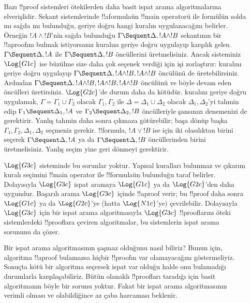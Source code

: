 Bazı !!{proof} sistemleri ötekilerden daha basit ispat arama algoritmalarına
elverişlidir. Sekant sistemlerinde !!a{formula}{}ün !!{main operator}{}ü ile
formülün solda mı sağda mı bulunduğu, geriye doğru hangi kuralın uygulanacağını
belirler. Örneğin $!A \land !B$'nin sağda bulunduğu
$\Gamma \Sequent \Delta, !A \land !B$ sekantının bir !!a{proof}{}ını bulmak
istiyorsanız \RightR{\land} kuralını geriye doğru uygulayıp karşılık gelen
$\Gamma \Sequent \Delta, !A$ ile $\Gamma \Sequent \Delta, !B$ öncüllerini
üretmelisiniz. Ancak sisteminiz $\Log{G1c}$ ise büzülme size daha çok seçenek
verdiği için işi zorlaştırır: \RightR{\Contraction} kuralını geriye doğru
uygulayıp $\Gamma \Sequent \Delta, !A \land !B, !A \land !B$ öncülünü de
üretebilirsiniz. Ardından
$\Gamma \Sequent \Delta, !A \land !B, !A \land !B, !A \land !B$ öncülünü
ve böyle devam eden öncülleri üretirsiniz. $\Log{G2c}$'de durum daha da
kötüdür. \RightR{\land} kuralını geriye doğru uygulamak, $\Gamma =
\Gamma_1 \cup \Gamma_2$ olacak $\Gamma_1,\Gamma_2$ ile $\Delta =
\Delta_1 \cup \Delta_2$ olacak $\Delta_1,\Delta_2$'yi tahmin edip
$\Gamma_1 \Sequent \Delta_1, !A$ ve $\Gamma_2 \Sequent \Delta_2, !B$
öncülleriyle şansınızı denemenizi de gerektirir. Yanlış tahmin daha sonra
çıkmaza götürebilir; başa dönüp başka $\Gamma_1,\Gamma_2,\Delta_1,\Delta_2$
seçmeniz gerekir. !!{formula}, $!A \lor !B$ ise \RightR{\lor} için iki
olasılıktan birini seçerek $\Gamma \Sequent \Delta, !A$ ya da
$\Gamma \Sequent \Delta, !B$ öncüllerinden birini üretmelisiniz. Yanlış
seçim yine geri dönmeyi gerektirir.

$\Log{G3c}$ sisteminde bu sorunlar yoktur. Yapısal kuralları bulunmaz ve
çıkarım kuralı seçimini !!{main operator} ile !!{formula}{}ün bulunduğu taraf
belirler. Dolayısıyla $\Log{G3c}$ ispat aramaya $\Log{G1c}$ ya da
$\Log{G2c}$'den daha uygundur. Başarılı arama $\Log{G3c}$ içinde !!a{proof}
verir; bu !!{proof} daha sonra $\Log{G1c}$ ya da $\Log{G2c}$'ye (hatta
$\Log{N1c}$'ye) çevrilebilir. Dolayısıyla $\Log{G3c}$ için bir ispat arama
algoritmasıyla $\Log{G3c}$ !!{proof}{}larını öteki sistemlerdeki !!{proof}{}lara
çeviren algoritmalar, bu sistemlerin ispat arama sorununu da çözer.

Bir ispat arama algoritmasının şaşmaz olduğunu nasıl biliriz? Bunun için,
algoritma !!a{proof} bulamazsa hiçbir !!{proof}{}ın var olamayacağını
göstermeliyiz. Sonuçta kötü bir algoritma seçersek ispat var olduğu halde onu
bulamadığı durumlarla karşılaşabiliriz. Bütün olanaklı !!{proof}{}ları taradığı
için basit algoritmanın böyle bir sorunu yoktur. Fakat bir ispat arama
algoritmasının verimli olması ve olabildiğince az çaba harcaması beklenir.

